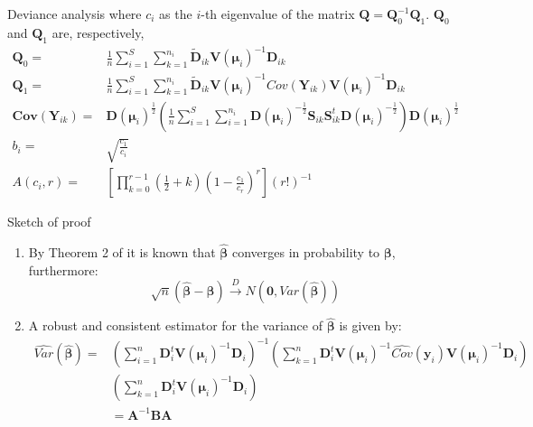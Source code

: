 \documentclass[t,9pt]{beamer}
\begin{document}
\begin{frame}[fragile]{Deviance analysis}
where $c_i$ as the $i$-th eigenvalue of the matrix  $\pmb{Q}=\pmb{Q}_0^{-1}\pmb{Q}_1$.   $\pmb{Q}_0$ and $\pmb{Q}_1$ are, respectively,
\begin{align*}
\pmb{Q}_0=&\frac{1}{n}\sum_{i=1}^S\sum_{k=1}^{n_i} \tilde{\pmb{D}}_{ik} \pmb{V}(\pmb{\mu}_i)^{-1} \pmb{D}_{ik} \\
\pmb{Q}_1=&\frac{1}{n}\sum_{i=1}^S\sum_{k=1}^{n_i}  \tilde{\pmb{D}}_{ik} \pmb{V}(\pmb{\mu}_i)^{-1}Cov(\pmb{Y}_{ik}) \pmb{V}(\pmb{\mu}_i)^{-1} \pmb{D}_{ik}\\
\pmb{Cov}(\pmb{Y}_{ik}) =& \pmb{D}\left(  \pmb{\mu}_i \right)^{\frac{1}{2}} \left(\frac{1}{n}\sum_{i=1}^S \sum_{i=1}^{n_i} \pmb{D}\left(  \pmb{\mu}_i \right)^{-\frac{1}{2}} \pmb{S}_{ik} \pmb{S}_{ik}^t  \pmb{D}\left(  \pmb{\mu}_i \right)^{-\frac{1}{2}} \right) \pmb{D}\left(  \pmb{\mu}_i \right)^{\frac{1}{2}}\\
b_i =& \sqrt{ \frac{c_1}{c_i}}\\
A(c_i, r)=&\left[ \prod_{k=0}^{r-1}\left(\frac{1}{2}+k \right)\left(1-\frac{c_1}{c_r} \right)^{r}\right] \left(r! \right)^{-1}
\end{align*}
\end{frame}
\begin{frame}[fragile]{Sketch of proof}
\begin{enumerate}
    \item By Theorem 2 of \cite{liang1986longitudinal} it is known that  $\hat{\pmb{\beta}}$ converges in probability to $\pmb{\beta}$, furthermore:
\begin{equation}\nonumber
\sqrt{n} (\hat{\pmb{\beta}}-\pmb{\beta}) \stackrel{D}{\rightarrow} N(\pmb{0}, Var(\hat{\pmb{\beta}}))
\end{equation} 
\item A robust and consistent estimator for the variance of  $\hat{\pmb{\beta}}$ \citep{panv} is given by:
\begin{align}
\widehat{Var}(\hat{\pmb{\beta}})=&\left(\sum_{i=1}^n \pmb{D}_{i}^t\pmb{V}(\pmb{\mu}_i)^{-1}\pmb{D}_{i} \right)^{-1} 
\left(\sum_{k=1}^n \pmb{D}_{i}^t \pmb{V}(\pmb{\mu}_i)^{-1} \widehat{Cov}(\pmb{y}_{i}) \pmb{V}(\pmb{\mu}_i)^{-1}\pmb{D}_{i} \right)\nonumber\\ &\left(\sum_{k=1}^n \pmb{D}_{i}^t \pmb{V}(\pmb{\mu}_i)^{-1}\pmb{D}_{i} \right)\nonumber\\
&= \pmb{A}^{-1}\pmb{B}\pmb{A}\nonumber
\end{align}
\end{enumerate}
\end{frame}
\end{document}
